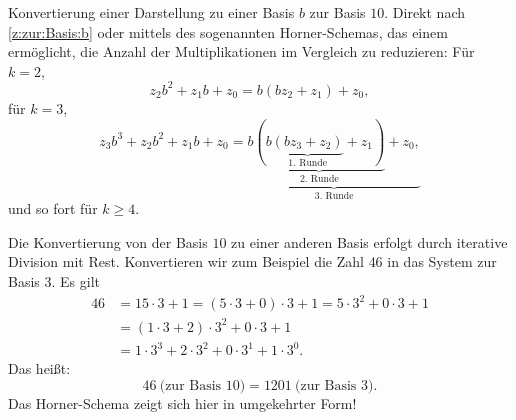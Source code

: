 \begin{bem}
	Konvertierung einer Darstellung zu einer Basis $b$ zur Basis $10$. Direkt nach \eqref{z:zur:Basis:b} oder mittels des sogenannten Horner-Schemas, das einem ermöglicht, die Anzahl der Multiplikationen im Vergleich zu reduzieren: 
	Für $k=2$,
	\[
	z_2 b^2 + z_1 b + z_0 = b (b z_2 + z_1) + z_0,
	\]
	für $k=3$,
	\[
	z_3 b^3 + z_2 b^2 + z_1 b + z_0 =  \underbrace{b \underbrace{( b \underbrace{(b z_3 + z_2)}_{\text{1. Runde}} + z_1 )}_{\text{2. Runde}}  + z_0,}_{\text{3. Runde}}
	\]
	und so fort für $k \geq 4$.
\end{bem}

\begin{bsp}
	Die Konvertierung von der Basis $10$ zu einer anderen Basis erfolgt durch iterative Division mit Rest. Konvertieren wir zum Beispiel die Zahl $46$ in das System zur Basis $3$. Es gilt
	\begin{align*}
		46 & = 15 \cdot 3 + 1 = (5 \cdot 3 + 0) \cdot 3 + 1 = 5 \cdot 3^2 + 0 \cdot 3 + 1 
		\\ & = (1 \cdot 3 + 2) \cdot 3^2 + 0 \cdot 3 + 1
		\\ & = 1 \cdot 3^3 + 2 \cdot 3^2 + 0 \cdot 3^1 + 1 \cdot 3^0.
	\end{align*}
	Das heißt:
	\[
	46 \ \text{(zur Basis $10$)} = 1201 \ \text{(zur Basis $3$)}.
	\]
	Das Horner-Schema zeigt sich hier in umgekehrter Form!
\end{bsp}

